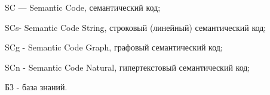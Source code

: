 \label{sec:reduction}

SC — Semantic Code, семантический код;

SCs- Semantic Code String, строковый (линейный) семантический код;

SCg - Semantic Code Graph, графовый семантический код;

SCn - Semantic Code Natural, гипертекстовый семантический код;

БЗ - база знаний.



